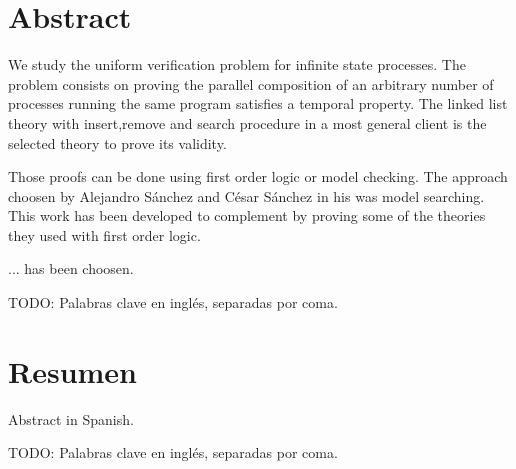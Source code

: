 \chapter*{Abstract}


\begin{abstractEn}

We study the uniform verification problem for infinite state processes. The problem consists on proving the parallel composition of an arbitrary number of processes running the same program satisfies a temporal property. The linked list theory with insert,remove and search procedure in a most general client is the selected theory to prove its validity.

Those proofs can be done using first order logic or model checking. The approach choosen by Alejandro Sánchez and César Sánchez in his  was model searching. This work has been developed to complement  by proving some of the theories they used with first order logic.

...
 has been choosen.

\end{abstractEn}

\begin{keywordsEn}
TODO: Palabras clave en inglés, separadas por coma.
\end{keywordsEn}

\chapter*{Resumen}

\begin{abstractEs}
Abstract in Spanish.
\end{abstractEs}

\begin{keywordsEs}
TODO: Palabras clave en inglés, separadas por coma.
\end{keywordsEs}
